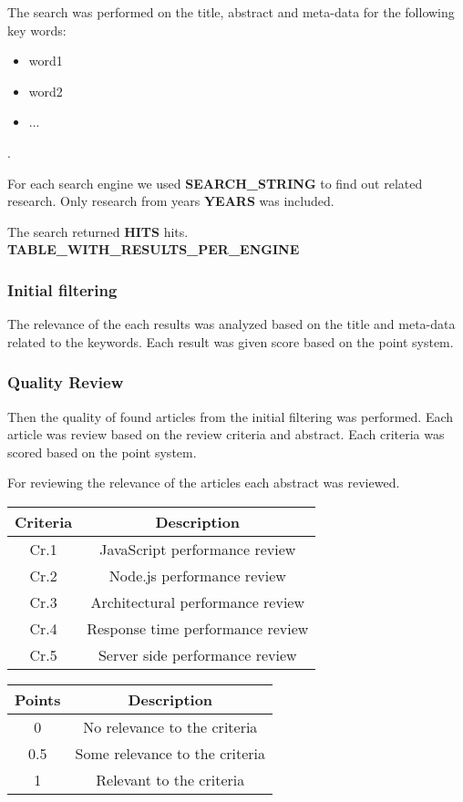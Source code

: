The search was performed on the title, abstract and meta-data for the following key words:
\begin{itemize}
    \item word1
    \item word2
    \item ...
\end{itemize}.

For each search engine we used \textbf{SEARCH\_STRING} to find out related research.
Only research from years \textbf{YEARS} was included.

The search returned \textbf{HITS} hits.
\textbf{TABLE\_WITH\_RESULTS\_PER\_ENGINE}


\subsubsection{Initial filtering}
The relevance of the each results was analyzed based on the title and meta-data related to the keywords. Each result was given score based on the point system.

\subsubsection{Quality Review}
Then the quality of found articles from the initial filtering was performed.
Each article was review based on the review criteria and abstract.
Each criteria was scored based on the point system.

For reviewing the relevance of the articles each abstract was reviewed.

\begin{flushleft}
\begin{tabular}{|c c|} 
 \hline
 Criteria & Description \\ [0.5ex] 
 \hline
  Cr.1 & JavaScript performance review  \\ 
  \hline
  Cr.2 & Node.js performance review  \\ 
  \hline
  Cr.3 & Architectural performance review  \\ 
  \hline
  Cr.4 & Response time performance review  \\ 
  \hline
  Cr.5 & Server side performance review  \\ 
  \hline
\end{tabular}
\end{flushleft}


\begin{flushleft}
\begin{tabular}{|c c|} 
 \hline
 Points & Description \\ [0.5ex] 
 \hline
  0 & No relevance to the criteria  \\ 
 \hline
  0.5 & Some relevance to the criteria \\ 
 \hline
 1 & Relevant to the criteria \\ 
 \hline
\end{tabular}
\end{flushleft}

